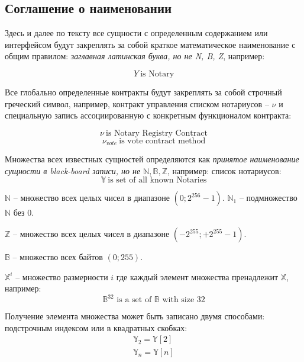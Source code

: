 \documentclass[12pt]{report}
\begin{document}
\subsection{Соглашение о наименовании}
\label{tech-review-naming}
\begin{multicols}{2}
Здесь и далее по тексту все сущности с определенным содержанием или интерфейсом будут закреплять за собой краткое математическое наименование с общим правилом: \textit{заглавная латинская буква, но не N, B, Z}, например: 

\begin{equation}
Y \ \text{is Notary}
\end{equation}

Все глобально определенные контракты будут закреплять за собой строчный греческий символ, например, контракт управления списком нотариусов – $\nu$ и специальную запись ассоциированную с конкретным функционалом контракта: 

\begin{equation}
\nu \ \text{is Notary Registry Contract}
\end{equation}
\begin{equation}
\nu_{vote} \ \text{is vote contract method}
\end{equation}

Множества всех известных сущностей определяются как \textit{принятое наименование сущности в black-board записи, но не $\mathbb{N}, \mathbb{B}, \mathbb{Z}$}, например: список нотариусов:
\begin{equation}
\mathbb{Y} \ \text{is set of all known Notaries}
\end{equation}

$\mathbb{N}$ – множество всех целых чисел в диапазоне $(0; 2^{256} - 1)$. $\mathbb{N}_1$ – подмножество $\mathbb{N}$ без 0.

$\mathbb{Z}$ – множество всех целых чисел в диапазоне $(-2^{255}; +2^{255} - 1)$. 

$\mathbb{B}$ – множество всех байтов $(0; 255)$. 

$\mathbb{X}^{i}$ – множество размерности $i$ где каждый элемент множества пренадлежит $\mathbb{X}$, например:
\begin{equation}
\mathbb{B}^{32} \text{ is a set of } \mathbb{B} \text{ with size } 32
\end{equation}

Получение элемента множества может быть записано двумя способами: подстрочным индексом или в квадратных скобках:
\begin{equation}
\begin{aligned}
\mathbb{Y}_2 = \mathbb{Y}[2] \\
\mathbb{Y}_n = \mathbb{Y}[n] 
\end{aligned}
\end{equation}


\end{multicols}
\end{document}
